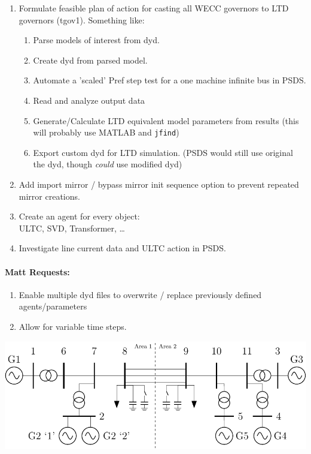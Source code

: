 \documentclass[12pt]{article}
\begin{document}
\begin{multicols}{2}
\begin{enumerate}
\begin{enumerate}
		\item Formulate feasible plan of action for casting all WECC governors to LTD governors (tgov1). Something like:
		\begin{enumerate}
		\item Parse models of interest from dyd.
		\item Create dyd from parsed model.
		\item Automate a 'scaled' Pref step test for a one machine infinite bus in PSDS.
		\item Read and analyze output data
		\item Generate/Calculate LTD equivalent model parameters from results (this will probably use MATLAB and \verb|jfind|)
		\item Export custom dyd for LTD simulation. (PSDS would still use original the dyd, though \emph{could} use modified dyd)
		\end{enumerate}

		\item Add import mirror / bypass mirror init sequence option to prevent repeated mirror creations.

		\item Create an agent for every object: \\ ULTC, SVD, Transformer, \ldots
		
		\item Investigate line current data and ULTC action in PSDS.
		
	\end{enumerate}

\paragraph{Matt Requests:}
\begin{enumerate}
		\item Enable multiple dyd files to overwrite / replace previously defined agents/parameters
		\item Allow for variable time steps.
\end{enumerate}

	\end{enumerate}
\includegraphics[width=\linewidth]{../../models/sixMachine/sixMachine}


\end{multicols}
\end{document}
